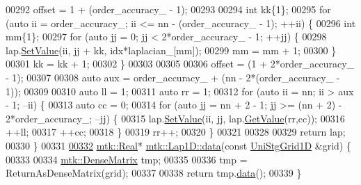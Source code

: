\begin{DoxyCode}
00292   offset = 1 + (order\_accuracy\_ - 1);
00293 
00294   \textcolor{keywordtype}{int} kk\{1\};
00295   \textcolor{keywordflow}{for} (\textcolor{keyword}{auto} ii = order\_accuracy\_; ii <= nn - (order\_accuracy\_ - 1); ++ii) \{
00296     \textcolor{keywordtype}{int} mm\{1\};
00297     \textcolor{keywordflow}{for} (\textcolor{keyword}{auto} jj = 0; jj < 2*order\_accuracy\_ - 1; ++jj) \{
00298       lap.\hyperlink{classmtk_1_1DenseMatrix_ae0f873a6d3a734da467cafb817da64ae}{SetValue}(ii, jj + kk, idx*laplacian\_[mm]);
00299       mm = mm + 1;
00300     \}
00301     kk = kk + 1;
00302   \}
00303 
00305 
00306   offset = (1 + 2*order\_accuracy\_ - 1);
00307 
00308   \textcolor{keyword}{auto} aux = order\_accuracy\_ + (nn - 2*(order\_accuracy\_ - 1));
00309 
00310   \textcolor{keyword}{auto} ll = 1;
00311   \textcolor{keyword}{auto} rr = 1;
00312   \textcolor{keywordflow}{for} (\textcolor{keyword}{auto} ii = nn; ii > aux - 1; --ii) \{
00313     \textcolor{keyword}{auto} cc = 0;
00314     \textcolor{keywordflow}{for} (\textcolor{keyword}{auto} jj = nn + 2 - 1; jj >= (nn + 2) - 2*order\_accuracy\_; --jj) \{
00315       lap.\hyperlink{classmtk_1_1DenseMatrix_ae0f873a6d3a734da467cafb817da64ae}{SetValue}(ii, jj, lap.\hyperlink{classmtk_1_1DenseMatrix_a87fb785713c04b13767947cc3325ce7c}{GetValue}(rr,cc));
00316       ++ll;
00317       ++cc;
00318     \}
00319     rr++;
00320   \}
00321 
00328 
00329   \textcolor{keywordflow}{return} lap;
00330 \}
00331 
\hypertarget{mtk__lap__1d_8cc_source_l00332}{}\hyperlink{classmtk_1_1Lap1D_a8c3151d792efbe69f34cbb9b5ea870e9}{00332} \hyperlink{group__c01-roots_gac080bbbf5cbb5502c9f00405f894857d}{mtk::Real}* \hyperlink{classmtk_1_1Lap1D_a8c3151d792efbe69f34cbb9b5ea870e9}{mtk::Lap1D::data}(\textcolor{keyword}{const} \hyperlink{classmtk_1_1UniStgGrid1D}{UniStgGrid1D} &grid) \{
00333 
00334   \hyperlink{classmtk_1_1DenseMatrix}{mtk::DenseMatrix} tmp;
00335 
00336   tmp = ReturnAsDenseMatrix(grid);
00337 
00338   \textcolor{keywordflow}{return} tmp.\hyperlink{classmtk_1_1DenseMatrix_a16b3ff56feb2658b9fc7147d1de4d8e7}{data}();
00339 \}
\end{DoxyCode}
